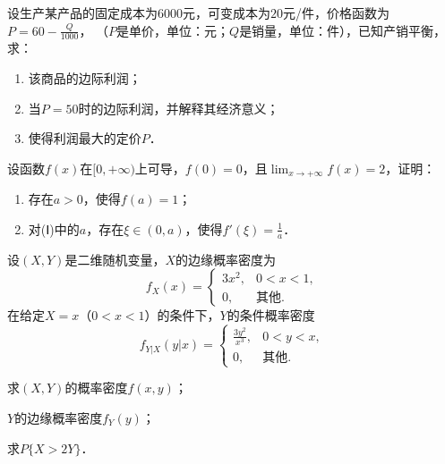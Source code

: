 \documentclass[plain,noanswer,medmath]{../../template/jnuexam}
\begin{document}




\begin{problem}[points=10]
设生产某产品的固定成本为$6000$元，可变成本为$20$元/件，价格函数为$P=60-\frac{Q}{1000}$，%
（$P$是单价，单位：元；$Q$是销量，单位：件），已知产销平衡，求：
\begin{enumerate}
\item 该商品的边际利润；
\item 当$P = 50$时的边际利润，并解释其经济意义；
\item 使得利润最大的定价$P$．
\end{enumerate}
\end{problem}


\begin{problem}[points=10]
设函数$f(x)$在$[0, +\infty)$上可导，$f(0) = 0$，且$\lim_{x \to +\infty} f(x) = 2$，证明：
\begin{enumerate}
\item 存在$a > 0$，使得$f(a) = 1$；
\item 对(Ⅰ)中的$a$，存在$\xi \in(0,a)$，使得$f'(\xi) = \frac{1}{a}$．
\end{enumerate}
\end{problem}






\begin{problem}[points=11]
设$\left(X,Y \right)$是二维随机变量，$X$的边缘概率密度为
$$f_X(x) = \begin{cases}
  3x^2, & 0 < x < 1, \\
     0, & \text{其他}.
\end{cases}$$
在给定$X = x$（$0 < x < 1$）的条件下，$Y$的条件概率密度
$$f_{Y|X}(y|x) = \begin{cases}
  \frac{3y^2}{x^3}, & 0 < y < x, \\
                 0, & \text{其他}.
\end{cases}$$
\begin{enumerate*}
\item 求$(X,Y)$的概率密度$f(x,y)$；
\item $Y$的边缘概率密度$f_Y(y)$；
\item 求$P\{X > 2Y\}$．
\end{enumerate*}
\end{problem}


\end{document}
